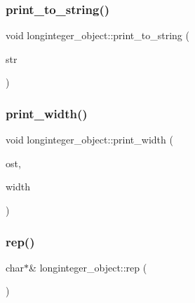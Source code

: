 \mbox{\label{classlonginteger__object_abf29fedc2ef57bb6c8bcc8e1f052efda}} 
\subsubsection{\texorpdfstring{print\+\_\+to\+\_\+string()}{print\_to\_string()}}
{\footnotesize\ttfamily void longinteger\+\_\+object\+::print\+\_\+to\+\_\+string (\begin{DoxyParamCaption}\item[{\mbox{\hyperlink{galois_8h_ab6cc7b4aeb6ea31aba2b3fbfc83ff5e6}{B\+Y\+TE}} $\ast$}]{str }\end{DoxyParamCaption})}

\mbox{\label{classlonginteger__object_a36a64729f6603815c359b0d6c9673478}} 
\subsubsection{\texorpdfstring{print\+\_\+width()}{print\_width()}}
{\footnotesize\ttfamily void longinteger\+\_\+object\+::print\+\_\+width (\begin{DoxyParamCaption}\item[{ostream \&}]{ost,  }\item[{\mbox{\hyperlink{galois_8h_a09fddde158a3a20bd2dcadb609de11dc}{I\+NT}}}]{width }\end{DoxyParamCaption})}

\mbox{\label{classlonginteger__object_a3ecaf12738cc721d281c416503f241e2}} 
\subsubsection{\texorpdfstring{rep()}{rep()}}
{\footnotesize\ttfamily char$\ast$\& longinteger\+\_\+object\+::rep (\begin{DoxyParamCaption}{ }\end{DoxyParamCaption})\hspace{0.3cm}{\ttfamily [inline]}}

